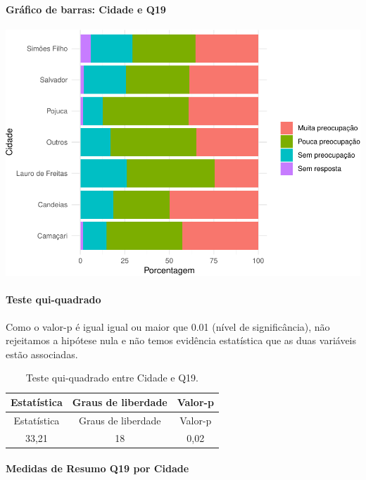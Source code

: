 \documentclass[]{article}
\let\oldparagraph\paragraph
\renewcommand{\paragraph}[1]{\oldparagraph{#1}\mbox{}}
\begin{document}
\hypertarget{gruxe1fico-de-barras-cidade-e-q19}{%
\paragraph{Gráfico de barras: Cidade e Q19}\label{gruxe1fico-de-barras-cidade-e-q19}}

\begin{center}\includegraphics[width=0.75\linewidth]{relatorio_covid19_files/figure-latex/unnamed-chunk-308-1} \end{center}

\hypertarget{teste-qui-quadrado-27}{%
\paragraph{Teste qui-quadrado}\label{teste-qui-quadrado-27}}

Como o valor-p é igual igual ou maior que 0.01 (nível de significância), não rejeitamos a hipótese nula e não temos evidência estatística que as duas variáveis estão associadas.

\begin{longtable}[]{@{}ccc@{}}
\caption{\label{tab:unnamed-chunk-310}Teste qui-quadrado entre Cidade e Q19.}\tabularnewline
\toprule
Estatística & Graus de liberdade & Valor-p\tabularnewline
\midrule
\endfirsthead
\toprule
Estatística & Graus de liberdade & Valor-p\tabularnewline
\midrule
\endhead
33,21 & 18 & 0,02\tabularnewline
\bottomrule
\end{longtable}

\cleardoublepage

\hypertarget{medidas-de-resumo-q19-por-cidade}{%
\paragraph{Medidas de Resumo Q19 por Cidade}\label{medidas-de-resumo-q19-por-cidade}}
\end{document}
